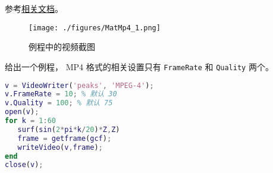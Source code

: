 
\begin{issues}
\issueDraft
\end{issues}


参考\href{https://www.mathworks.com/help/matlab/ref/videowriter.html}{相关文档}。

\begin{figure}[ht]
\centering
\texttt{[image: ./figures/MatMp4\_1.png]}
\caption{例程中的视频截图} \label{MatMp4_fig1}
\end{figure}


给出一个例程， MP4 格式的相关设置只有 \verb|FrameRate| 和 \verb|Quality| 两个。
\begin{lstlisting}[language=matlab, caption=mp4\_demo.m]
% 写 mp4 视频
v = VideoWriter('peaks', 'MPEG-4');
v.FrameRate = 10; % 默认 30
v.Quality = 100; % 默认 75
open(v);
for k = 1:60 
   surf(sin(2*pi*k/20)*Z,Z)
   frame = getframe(gcf);
   writeVideo(v,frame);
end
close(v);
\end{lstlisting}
